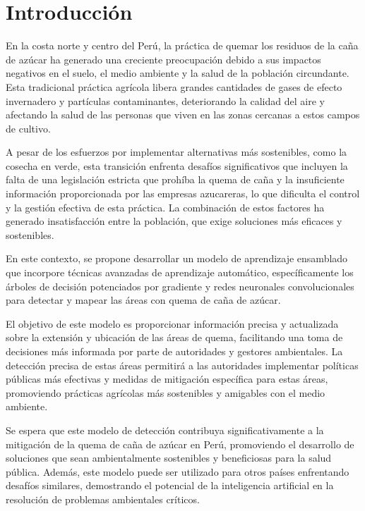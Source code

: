 \section{Introducción}
En la costa norte y centro del Perú, la práctica de quemar los residuos de la caña de azúcar ha generado una creciente preocupación debido a sus impactos negativos en el suelo, el medio ambiente y la salud 
de la población circundante. Esta tradicional práctica agrícola libera grandes cantidades de gases de efecto invernadero y partículas contaminantes, deteriorando la calidad del aire y afectando la salud de 
las personas que viven en las zonas cercanas a estos campos de cultivo.

A pesar de los esfuerzos por implementar alternativas más sostenibles, como la cosecha en verde, esta transición enfrenta desafíos significativos que incluyen la falta de una legislación 
estricta que prohíba la quema de caña y la insuficiente información proporcionada por las empresas azucareras, lo que dificulta el control y la gestión efectiva de esta práctica. La combinación de estos factores 
ha generado insatisfacción entre la población, que exige soluciones más eficaces y sostenibles.

En este contexto, se propone desarrollar un modelo de aprendizaje ensamblado que incorpore técnicas avanzadas de aprendizaje automático, específicamente los árboles de decisión potenciados por gradiente y redes neuronales convolucionales para detectar 
y mapear las áreas con quema de caña de azúcar. 

El objetivo de este modelo es proporcionar información precisa y actualizada sobre la extensión y ubicación de las áreas de quema, facilitando una toma de decisiones más informada por parte de autoridades y gestores ambientales. 
La detección precisa de estas áreas permitirá a las autoridades implementar políticas públicas más efectivas y medidas de mitigación específica para estas áreas, promoviendo prácticas agrícolas más sostenibles y amigables con el medio ambiente.

Se espera que este modelo de detección contribuya significativamente a la mitigación de la quema de caña de azúcar en Perú, promoviendo el desarrollo de soluciones que sean ambientalmente sostenibles y beneficiosas para 
la salud pública. Además, este modelo puede ser utilizado para otros países enfrentando desafíos similares, demostrando el potencial de la inteligencia artificial en la resolución de problemas ambientales críticos.


